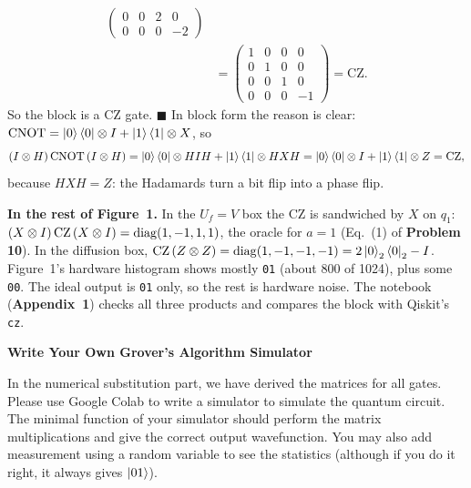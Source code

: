 \documentclass[a4paper, 10pt]{article}
\begin{document}
\begin{solution}
\begin{align*}
\begin{pmatrix}
			             0 & 0 & 2 & 0  \\
			             0 & 0 & 0 & -2
		             \end{pmatrix}       \\
		 & = \begin{pmatrix}
			     1 & 0 & 0 & 0  \\
			     0 & 1 & 0 & 0  \\
			     0 & 0 & 1 & 0  \\
			     0 & 0 & 0 & -1
		     \end{pmatrix} = \mathrm{CZ}.
	\end{align*}
	So the block is a CZ gate. \( \blacksquare \) In block form the reason is clear: \( \mathrm{CNOT} = \ket{0}\bra{0} \otimes I + \ket{1}\bra{1} \otimes X \), so
	\[
		\left(I \otimes H\right)\mathrm{CNOT}\left(I \otimes H\right) = \ket{0}\bra{0} \otimes H I H + \ket{1}\bra{1} \otimes H X H = \ket{0}\bra{0} \otimes I + \ket{1}\bra{1} \otimes Z = \mathrm{CZ},
	\]
	because \( HXH = Z \): the Hadamards turn a bit flip into a phase flip.

	\myspace

	\noindent \textbf{In the rest of Figure~1.} In the \( U_f = V \) box the CZ is sandwiched by \( X \) on \( q_1 \): \( \left(X \otimes I\right)\mathrm{CZ}\left(X \otimes I\right) = \mathrm{diag}(1, -1, 1, 1) \), the oracle for \( a = 1 \) (Eq.~(1) of \textbf{Problem 10}).
	In the diffusion box, \( \mathrm{CZ}\left(Z \otimes Z\right) = \mathrm{diag}(1, -1, -1, -1) = 2\ket{0}_2\bra{0}_2 - I \).
	Figure~1's hardware histogram shows mostly \texttt{01} (about 800 of 1024), plus some \texttt{00}. The ideal output is \texttt{01} only, so the rest is hardware noise. The notebook (\textbf{Appendix~1}) checks all three products and compares the block with Qiskit's \texttt{cz}.
\end{solution}

\newpage

\begin{problem}
\textbf{Write Your Own Grover's Algorithm Simulator}
\par In the numerical substitution part, we have derived the matrices for all gates.
Please use Google Colab to write a simulator to simulate the quantum circuit.
The minimal function of your simulator should perform the matrix multiplications and give the correct output wavefunction.
You may also add measurement using a random variable to see the statistics
(although if you do it right, it always gives \( \ket{01} \)).
\end{problem}
\end{document}
